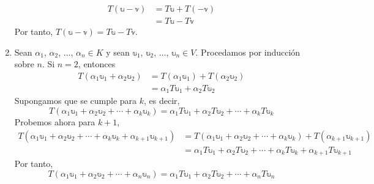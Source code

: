 \begin{theorem}
\begin{enumerate}[label=\roman*)]
        \begin{align*}
            T(\mathbb{u} - \mathbb{v}) & = T\mathbb{u} + T(-\mathbb{v}) \\
            & = T\mathbb{u} - T\mathbb{v}
        \end{align*}
        Por tanto, $T(\mathbb{u} - \mathbb{v}) = T\mathbb{u} - T\mathbb{v}$.
        \item Sean $\alpha_1$, $\alpha_2$, $\dots$, $\alpha_n \in K$ y sean $\mathbb{u}_1$, $\mathbb{u}_2$, $\dots$, $\mathbb{u}_n \in V$. Procedamos por inducción sobre $n$. Si $n = 2$, entonces
        \begin{align*}
            T(\alpha_1 \mathbb{u}_1 + \alpha_2 \mathbb{u}_2) & = T(\alpha_1 \mathbb{u}_1) + T(\alpha_2 \mathbb{u}_2) \\
            & = \alpha_1 T\mathbb{u}_1 + \alpha_2 T\mathbb{u}_2
        \end{align*}
        Supongamos que se cumple para $k$, es decir,
        $$T(\alpha_1 \mathbb{u}_1 + \alpha_2 \mathbb{u}_2 + \cdots + \alpha_k \mathbb{u}_k) = \alpha_1 T\mathbb{u}_1 + \alpha_2 T\mathbb{u}_2 + \cdots + \alpha_k T\mathbb{u}_k$$
        Probemos ahora para $k+1$,
        \begin{align*}
            T(\alpha_1 \mathbb{u}_1 + \alpha_2 \mathbb{u}_2 + \cdots + \alpha_k \mathbb{u}_k + \alpha_{k+1} \mathbb{u}_{k+1}) & = T(\alpha_1 \mathbb{u}_1 + \alpha_2 \mathbb{u}_2 + \cdots + \alpha_k \mathbb{u}_k) + T(\alpha_{k+1} \mathbb{u}_{k+1}) \\
            & = \alpha_1 T\mathbb{u}_1 + \alpha_2 T\mathbb{u}_2 + \cdots + \alpha_k T\mathbb{u}_k + \alpha_{k+1} T\mathbb{u}_{k+1}
        \end{align*}
        Por tanto,
        $$T(\alpha_1 \mathbb{u}_1 + \alpha_2 \mathbb{u}_2 + \cdots + \alpha_n \mathbb{u}_n) = \alpha_1 T\mathbb{u}_1 + \alpha_2 T\mathbb{u}_2 + \cdots + \alpha_n T\mathbb{u}_n$$
    \end{enumerate}
\end{theorem}

